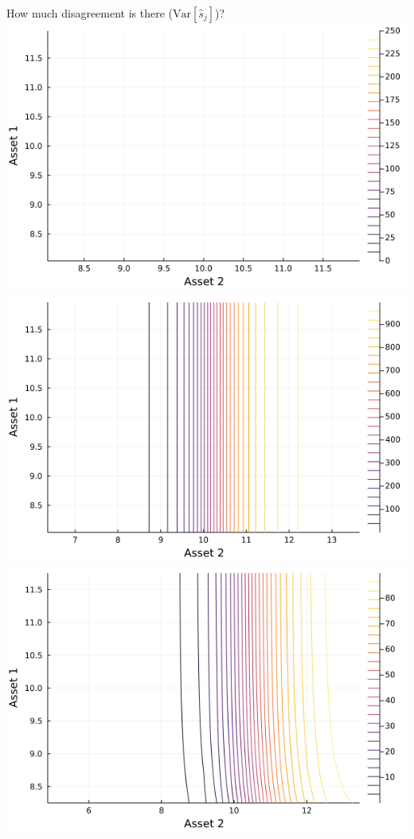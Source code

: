 \documentclass[
  ignorenonframetext,
]{beamer}
\begin{document}
\begin{frame}{How much disagreement is there
(\(\text{Var}[\hat s_j]\))?}
\protect\hypertarget{how-much-disagreement-is-there-textvarhat-s_j}{}
\includegraphics[width=0.4\paperheight]{complexity_files/figure-beamer/unnamed-chunk-18-1}
\includegraphics[width=0.4\paperheight]{complexity_files/figure-beamer/unnamed-chunk-18-2}
\includegraphics[width=0.4\paperheight]{complexity_files/figure-beamer/unnamed-chunk-18-3}

\end{frame}
\end{document}

